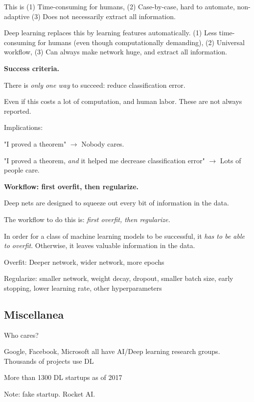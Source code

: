\documentclass[english]{article}
\begin{document}
\item This is (1) Time-consuming for humans, (2) Case-by-case, hard to automate, non-adaptive (3) Does not necessarily extract all information.

\item Deep learning replaces this by learning features automatically. (1) Less time-consuming for humans (even though computationally demanding), (2) Universal workflow, (3) Can always make network huge, and extract all information. 

\eenum 


\item {\bf Success criteria.}

\benum 
\item There is \emph{only one way} to succeed: reduce classification error. 
\item Even if this costs a lot of computation, and human labor. These are not always reported. 
\item Implications: 

"I proved a theorem" $\to$ Nobody cares.

"I proved a theorem, \emph{and} it helped me decrease classification error" $\to$ Lots of people care.


\eenum 


\item {\bf Workflow: first overfit, then regularize.}

\benum 
\item Deep nets are designed to squeeze out every bit of information in the data.
\item The workflow to do this is: \emph{first overfit, then regularize.}
\item In order for a class of machine learning models to be successful, it \emph{has to be able to overfit}. Otherwise, it leaves valuable information in the data. 

Overfit: Deeper network, wider network, more epochs

\item Regularize: smaller network, weight decay, dropout, smaller batch size, early stopping, lower learning rate, other hyperparameters

\eenum 


\eenum 


\subsection{Miscellanea}
\benum 
\item Who cares?
\bitem
\item Google, Facebook, Microsoft all have AI/Deep learning research groups. Thousands of projects use DL
\item More than 1300 DL startups as of 2017
\item Note: fake startup. Rocket AI. 
\end{document}
